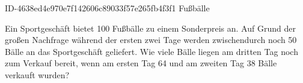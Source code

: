 \begin{exercise}
      {ID-4638ed4e970e7f142606c89033f57e265fb4f3f1}
      {Fußbälle}
  \ifproblem\problem\par
    Ein Sportgeschäft bietet 100 Fußbälle zu einem Sonderpreis an. Auf Grund der
    großen Nachfrage während der ersten zwei Tage werden zwischendurch noch 50
    Bälle an das Sportgeschäft geliefert. Wie viele Bälle liegen am dritten
    Tag noch zum Verkauf bereit, wenn am ersten Tag 64 und am zweiten Tag 38
    Bälle verkauft wurden?
  \fi
\end{exercise}
